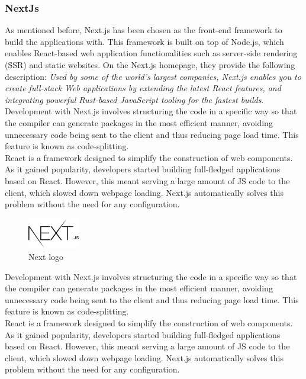 \documentclass[../memory.tex]{subfiles}
\begin{document}
\subsubsection{NextJs}
As mentioned before, Next.js has been chosen as the front-end framework to build
the applications with. This framework is built on top of Node.js, which enables
React-based web application functionalities such as server-side rendering (SSR)
and static websites. On the Next.js homepage, they provide the following
description: \emph{Used by some of the world's largest companies, Next.js
	enables you to create full-stack Web applications by extending the latest React
	features, and integrating powerful Rust-based JavaScript tooling for the fastest
	builds}\cite{nextjs}.
\\[8pt]
Development with Next.js involves structuring the code in a specific way so
that the compiler can generate packages in the most efficient manner,
avoiding unnecessary code being sent to the client and thus reducing page
load time. This feature is known as code-splitting.
\\
React is a framework designed to simplify the construction of web components. As
it gained popularity, developers started building full-fledged applications
based on React. However, this meant serving a large amount of JS code to the
client, which slowed down webpage loading. Next.js automatically solves this
problem without the need for any configuration.
\begin{figure}[H]
	\centering
	\includegraphics[width=0.2\textwidth]{./assets/logos/next-logo.png}
	\caption{Next logo}
\end{figure}
Development with Next.js involves structuring the code in a specific way so that
the compiler can generate packages in the most efficient manner, avoiding
unnecessary code being sent to the client and thus reducing page load time. This
feature is known as code-splitting.
\\
React is a framework designed to simplify the construction of web components. As
it gained popularity, developers started building full-fledged applications
based on React. However, this meant serving a large amount of JS code to the
client, which slowed down webpage loading. Next.js automatically solves this
problem without the need for any configuration.
\end{document}
